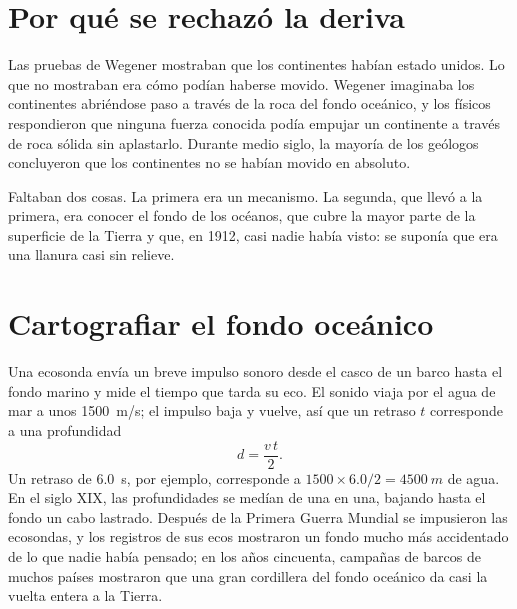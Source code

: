\section{Por qué se rechazó la deriva}

Las pruebas de Wegener mostraban que los continentes habían estado unidos. Lo
que no mostraban era cómo podían haberse movido. Wegener imaginaba los
continentes abriéndose paso a través de la roca del fondo oceánico, y los físicos respondieron que ninguna fuerza conocida podía empujar un continente a través de roca sólida
sin aplastarlo. Durante medio siglo, la mayoría de los geólogos concluyeron
que los continentes no se habían movido en absoluto.

Faltaban dos cosas. La primera era un mecanismo. La segunda, que llevó a la
primera, era conocer el fondo de los océanos, que cubre la mayor parte de la
superficie de la Tierra y que, en 1912, casi nadie había visto: se suponía que
era una llanura casi sin relieve.

\section{Cartografiar el fondo oceánico}

Una ecosonda envía un breve impulso sonoro desde el casco de un barco hasta
el fondo marino y mide el tiempo que tarda su eco. El sonido viaja por el agua
de mar a unos \qty{1500}{m/s}; el impulso baja y vuelve, así que un retraso
$t$ corresponde a una profundidad
\[
  d = \frac{v\,t}{2}.
\]
Un retraso de \qty{6.0}{s}, por ejemplo, corresponde a $1500 \times 6.0/2 =
\qty{4500}{m}$ de agua. En el siglo XIX, las profundidades se medían de una
en una, bajando hasta el fondo un cabo lastrado. Después de la Primera Guerra
Mundial se impusieron las ecosondas, y los registros de sus ecos mostraron un
fondo mucho más accidentado de lo que nadie había pensado; en los años cincuenta, campañas de barcos de muchos países mostraron que una
gran cordillera del fondo oceánico da casi la vuelta entera a la
Tierra.


